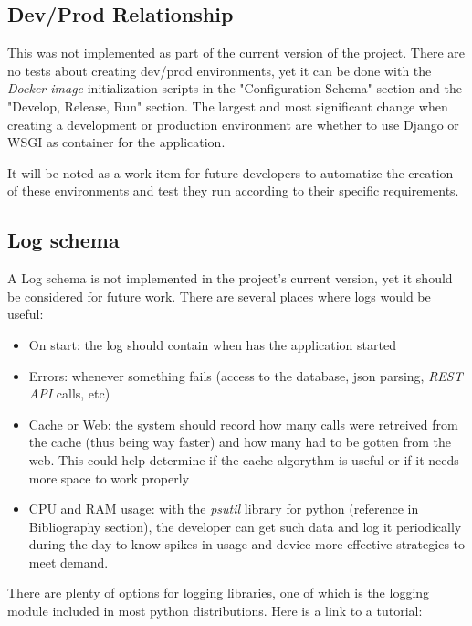 \documentclass[10pt]{article}
\begin{document}
 \subsection{Dev/Prod Relationship}
 
This was not implemented as part of the current version of the project. There are no tests about creating dev/prod environments, yet it can be done with the \textit{Docker image} initialization scripts in the "Configuration Schema" section and the "Develop, Release, Run" section. The largest and most significant change when creating a development or production environment are whether to use Django or WSGI as container for the application. 

It will be noted as a work item for future developers to automatize the creation of these environments and test they run according to their specific requirements.
 
 \subsection{Log schema}
 
A Log schema is not implemented in the project's current version, yet it should be considered for future work. There are several places where logs would be useful:

\begin{itemize}
	\item On start: the log should contain when has the application started
  	\item Errors: whenever something fails (access to the database, json parsing, \textit{REST API} calls, etc)
  	\item Cache or Web: the system should record how many calls were retreived from the cache (thus being way faster) and how many had to be gotten from the web. This could help determine if the cache algorythm is useful or if it needs more space to work properly
  	\item CPU and RAM usage: with the \textit{psutil} library for python (reference in Bibliography section), the developer can get such data and log it periodically during the day to know spikes in usage and device more effective strategies to meet demand.
\end{itemize}
 	
There are plenty of options for logging libraries, one of which is the logging module included in most python distributions. Here is a link to a tutorial:\\
\end{document}
